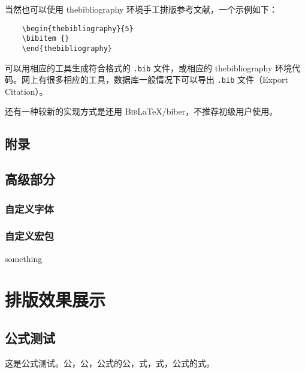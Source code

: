 \documentclass[%
               print, 
               timesmath
              ]{xjtubsc}
\begin{document}
当然也可以使用 thebibliography 环境手工排版参考文献，一个示例如下：
\begin{verbatim}
    \begin{thebibliography}{5}
    \bibitem {}
    \end{thebibliography}
\end{verbatim}

可以用相应的工具生成符合格式的 \verb|.bib| 文件，或相应的 thebibliography 环境代码。网上有很多相应的工具，数据库一般情况下可以导出 \verb|.bib| 文件（Export Citation）。

还有一种较新的实现方式是还用 \textsc{Bib}\LaTeX{}/biber，不推荐初级用户使用。
\subsection{附录}

\subsection{高级部分}

\subsubsection{自定义字体}
\subsubsection{自定义宏包}
something

\section{排版效果展示}

\subsection{公式测试}
这是公式测试。公，公，公式的公，式，式，公式的式。

\blindtext
\end{document}
